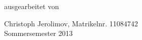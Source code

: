 \begin{center}
\vspace{2.0cm}

\begin{large}
	ausgearbeitet von\\
	\vspace{0.2cm}
\end{large}

\begin{Large}
	Christoph Jerolimov, Matrikelnr. 11084742\\
	\vspace{0.5cm}
	Sommersemester 2013
\end{Large}

\end{center}

\onehalfspacing

\mainmatter
	\setcounter{chapter}{2}
	\setcounter{table}{1}
	\setcounter{figure}{1}
	

